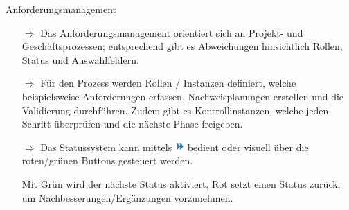 \documentclass{article}
\begin{document}
\begin{beamerlikethm}{Anforderungsmanagement}
\begin{itemize}
  \item[$\Longrightarrow$] Das Anforderungsmanagement orientiert sich an Projekt- und Geschäftsprozessen; entsprechend gibt es Abweichungen hinsichtlich Rollen, Status und Auswahlfeldern.
  \item[$\Longrightarrow$] Für den Prozess werden Rollen / Instanzen definiert, welche beispielsweise Anforderungen erfassen, Nachweisplanungen erstellen und die Validierung durchführen. Zudem gibt es Kontrollinstanzen, welche jeden Schritt überprüfen und die nächste Phase freigeben.
  \item[$\Longrightarrow$] Das Statussystem kann mittels \includegraphics[height=10pt]{Icons/Status_aendern.jpg} bedient oder visuell über die roten/grünen Buttons gesteuert werden.

\begin{center}
\end{center}
\small{Mit Grün wird der nächste Status aktiviert, Rot setzt einen Status zurück, um Nachbesserungen/Ergänzungen vorzunehmen.}

\end{itemize}
\end{beamerlikethm}

\end{document}
